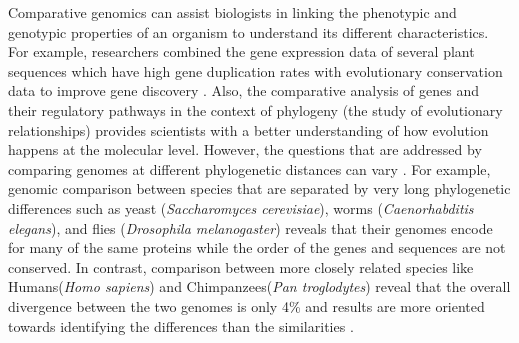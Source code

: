 Comparative genomics can assist biologists in linking the phenotypic and genotypic properties of an organism to understand its different characteristics. For example, researchers combined the gene expression data of several plant sequences which have high gene duplication rates with evolutionary conservation data to improve gene discovery \cite{hanada2008importance}. Also, the comparative analysis of genes and their regulatory pathways in the context of phylogeny (the study of evolutionary relationships) provides scientists with a better understanding of how evolution happens at the molecular level\cite{soltis2003role}. However, the questions that are addressed by comparing genomes at different phylogenetic distances can vary \cite{hardison2003comparative}. For example, genomic comparison between species that are separated by very long phylogenetic differences such as yeast (\textit{Saccharomyces cerevisiae}), worms (\textit{Caenorhabditis
elegans}), and flies (\textit{Drosophila melanogaster}) reveals that their genomes encode for many of the same proteins while the order of the genes and sequences are not conserved\cite{rubin2000comparative}. In contrast, comparison between more closely related species like Humans(\textit{Homo sapiens}) and Chimpanzees(\textit{Pan troglodytes}) reveal that the overall divergence between the two genomes is only 4\% and results are more oriented towards identifying the differences than the similarities \cite{varki2005comparing}. 

